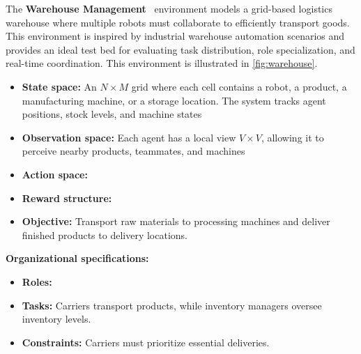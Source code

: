 The \textbf{Warehouse Management}~\cite{warehouse_management} environment models a grid-based logistics warehouse where multiple robots must collaborate to efficiently transport goods. This environment is inspired by industrial warehouse automation scenarios and provides an ideal test bed for evaluating task distribution, role specialization, and real-time coordination. This environment is illustrated in \autoref{fig:warehouse}.
%
\begin{itemize}
  \item \textbf{State space:} An $N \times M$ grid where each cell contains a robot, a product, a manufacturing machine, or a storage location. The system tracks agent positions, stock levels, and machine states
  \item \textbf{Observation space:} Each agent has a local view $V \times V$, allowing it to perceive nearby products, teammates, and machines
  \item \textbf{Action space:}
  \item \textbf{Reward structure:}
  \item \textbf{Objective:} Transport raw materials to processing machines and deliver finished products to delivery locations.
\end{itemize}
%
\textbf{Organizational specifications:}
\begin{itemize}
  \item \textbf{Roles:} 
  \item \textbf{Tasks:} Carriers transport products, while inventory managers oversee inventory levels.
  \item \textbf{Constraints:} Carriers must prioritize essential deliveries.
\end{itemize}

